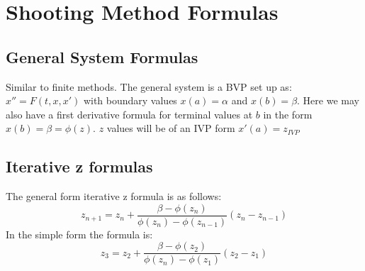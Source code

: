 \section{Shooting Method Formulas}

\subsection*{General System Formulas}
Similar to finite methods.
The general system is a BVP set up as:
$ x'' = F(t, x, x')$ with boundary values $x(a) = \alpha$ and $x(b) = \beta$.
Here we may also have a first derivative formula for terminal values at $b$ in
the form $x(b) = \beta = \phi(z)$. $z$ values will be of an IVP form $x'(a) = z_{IVP}$
\subsection*{Iterative z formulas}
The general form iterative z formula is as follows:
\[
z_{n+1} = z_n + \frac{\beta - \phi(z_n)}{\phi(z_n) - \phi(z_{n-1})}(z_n - z_{n-1})
\]
In the simple form the formula is:
\[
z_3 = z_2 + \frac{\beta - \phi(z_2)}{\phi(z_n) - \phi(z_1)}(z_2 - z_1)
\]

